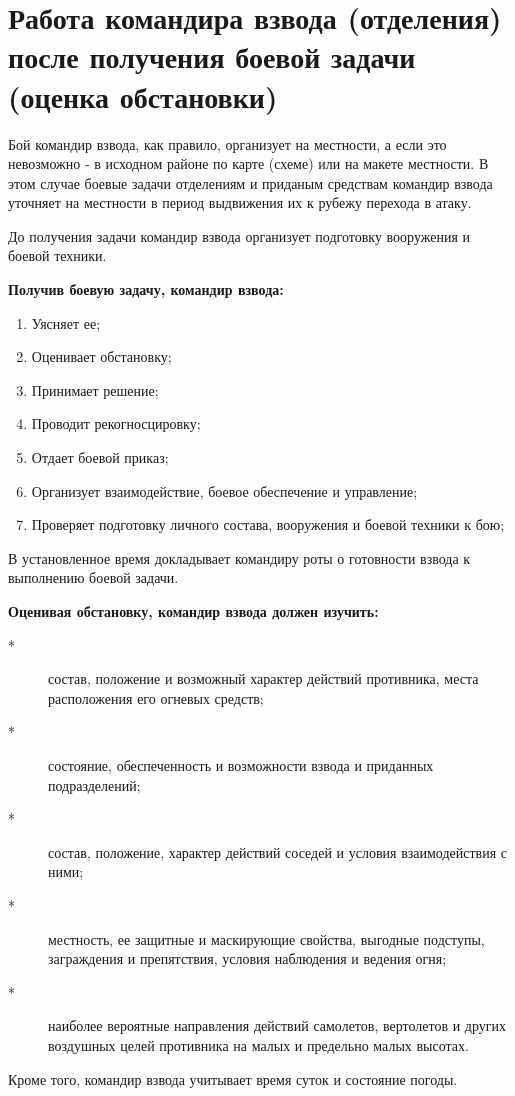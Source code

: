 \documentclass[12pt,a4paper]{report}
\begin{document}
\section{Работа командира взвода (отделения) после получения боевой задачи (оценка обстановки)}

Бой командир взвода, как правило, организует на местности, а если это невозможно - в исходном районе по карте (схеме) или на макете местности. В этом случае боевые задачи отделениям и приданым средствам командир взвода уточняет на местности в период выдвижения их к рубежу перехода в атаку.

До получения задачи командир взвода организует подготовку вооружения и боевой техники. 

\textbf{Получив боевую задачу, командир взвода:}
\begin{enumerate}
 \item Уясняет ее;
 \item Оценивает обстановку;
 \item Принимает решение;
 \item Проводит рекогносцировку;
 \item Отдает боевой приказ;
 \item Организует взаимодействие, боевое обеспечение и управление;
 \item Проверяет подготовку личного состава, вооружения и боевой техники к бою;
\end{enumerate}
В установленное время докладывает командиру роты о готовности взвода к выполнению боевой задачи.

\textbf{Оценивая обстановку, командир взвода должен изучить:}
\begin{description}
	\item[*]состав, положение и возможный характер действий противника, места расположения его огневых средств;
	\item[*]состояние, обеспеченность и возможности взвода и приданных подразделений;
	\item[*]состав, положение, характер действий соседей и условия взаимодействия с ними;
	\item[*] местность, ее защитные и маскирующие свойства, выгодные подступы, заграждения и препятствия, условия наблюдения и ведения огня;
	\item[*]наиболее вероятные направления действий самолетов, вертолетов и других воздушных целей противника на малых и предельно малых высотах.
\end{description}
Кроме того, командир взвода учитывает время суток и состояние погоды.
\end{document}
